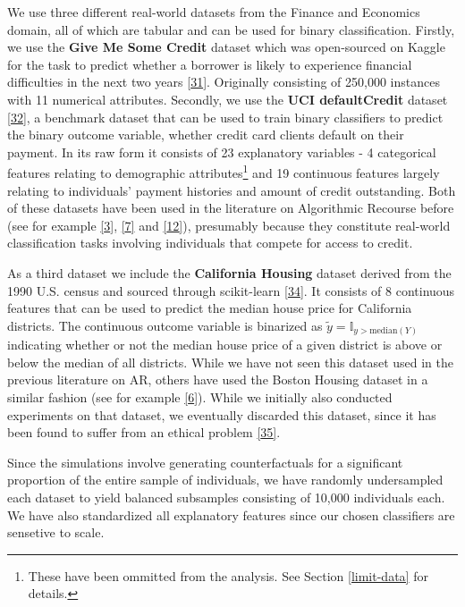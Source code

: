 \documentclass[conference,final,]{IEEEtran}
\begin{document}
We use three different real-world datasets from the Finance and Economics domain, all of which are tabular and can be used for binary classification. Firstly, we use the \textbf{Give Me Some Credit} dataset which was open-sourced on Kaggle for the task to predict whether a borrower is likely to experience financial difficulties in the next two years \protect\hyperlink{ref-gmsc_data}{{[}31{]}}. Originally consisting of 250,000 instances with 11 numerical attributes. Secondly, we use the \textbf{UCI defaultCredit} dataset \protect\hyperlink{ref-yeh2009comparisons}{{[}32{]}}, a benchmark dataset that can be used to train binary classifiers to predict the binary outcome variable, whether credit card clients default on their payment. In its raw form it consists of 23 explanatory variables - 4 categorical features relating to demographic attributes\footnote{These have been ommitted from the analysis. See Section \ref{limit-data} for details.} and 19 continuous features largely relating to individuals' payment histories and amount of credit outstanding. Both of these datasets have been used in the literature on Algorithmic Recourse before (see for example \protect\hyperlink{ref-pawelczyk2021carla}{{[}3{]}}, \protect\hyperlink{ref-joshi2019towards}{{[}7{]}} and \protect\hyperlink{ref-ustun2019actionable}{{[}12{]}}), presumably because they constitute real-world classification tasks involving individuals that compete for access to credit.

As a third dataset we include the \textbf{California Housing} dataset derived from the 1990 U.S. census and sourced through scikit-learn \protect\hyperlink{ref-pace1997sparse}{{[}34{]}}. It consists of 8 continuous features that can be used to predict the median house price for California districts. The continuous outcome variable is binarized as \(\tilde{y}=\mathbb{I}_{y>\text{median}(Y)}\) indicating whether or not the median house price of a given district is above or below the median of all districts. While we have not seen this dataset used in the previous literature on AR, others have used the Boston Housing dataset in a similar fashion (see for example \protect\hyperlink{ref-schut2021generating}{{[}6{]}}). While we initially also conducted experiments on that dataset, we eventually discarded this dataset, since it has been found to suffer from an ethical problem \protect\hyperlink{ref-carlisle2019racist}{{[}35{]}}.

Since the simulations involve generating counterfactuals for a significant proportion of the entire sample of individuals, we have randomly undersampled each dataset to yield balanced subsamples consisting of 10,000 individuals each. We have also standardized all explanatory features since our chosen classifiers are sensetive to scale.
\end{document}
